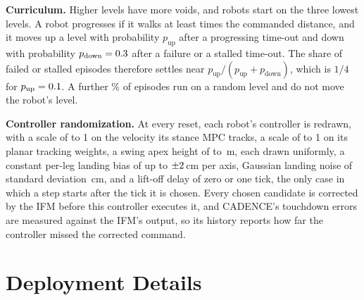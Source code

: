 \noindent\textbf{Curriculum.}
 Higher levels have more voids, and robots start on the
three lowest levels. A robot progresses if it walks at least
\corlCurriculumProgress{} times the commanded distance, and it moves up
a level with probability $p_{\text{up}}$ after a progressing time-out
and down with probability $p_{\text{down}} = 0.3$ after a
failure or a stalled time-out. The share of failed or stalled episodes
therefore settles near $p_{\text{up}}/(p_{\text{up}} +
p_{\text{down}})$, which is $1/4$ for $p_{\text{up}} =
0.1$. A further \corlWalkRandomPct\% of episodes run on a
random level and do not move the robot's level.

\noindent\textbf{Controller randomization.}
 At every reset, each robot's controller is redrawn, with
a scale of \corlRandTrackMin{} to 1 on the velocity its stance MPC
tracks, a scale of \corlRandPlanarMin{} to 1 on its planar tracking
weights, a swing apex height of \corlRandApexMin{} to
\corlRandApexMax\,m, each drawn uniformly, a constant per-leg landing
bias of up to $\pm2$\,cm per axis, Gaussian landing noise
of standard deviation \corlRandNoiseCm\,cm, and a lift-off delay
of zero or one tick, the only case in which a step starts after the
tick it is chosen. Every chosen candidate is corrected by the IFM
before this controller executes it, and CADENCE's touchdown errors are
measured against the IFM's output, so its history reports how far the
controller missed the corrected command.

\section{Deployment Details}
\label{app:deployment}

